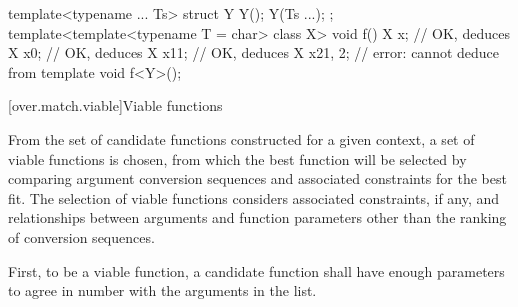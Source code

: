 %

\pnum
\begin{example}
\begin{codeblock}
template<typename ... Ts>
struct Y {
  Y();
  Y(Ts ...);
};
template<template<typename T = char> class X>
void f() {
  X x;          // OK, deduces 
  X x0{};       // OK, deduces 
  X x1{1};      // OK, deduces 
  X x2{1, 2};   // error: cannot deduce  from 
}
template void f<Y>();
\end{codeblock}
\end{example}

[over.match.viable]{Viable functions}%

\pnum
From the set of candidate functions constructed for a given
context, a set of viable functions is
chosen, from which the best function will be selected by
comparing argument conversion sequences
and associated constraints
for the best fit.
The selection of viable functions considers
associated constraints, if any, and
relationships between arguments and function parameters other
than the ranking of conversion sequences.

\pnum
{}%
%
First, to be a viable function, a candidate function shall have
enough parameters to agree in number with the arguments in the
list.

